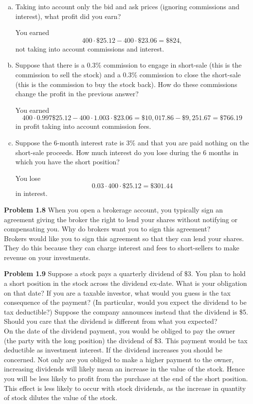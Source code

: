 \documentclass[12pt]{article}
\newcommand{\problem}[1]{\bigskip \noindent \textbf{Problem #1}}
\theoremstyle{plain}
\begin{document}
\begin{enumerate}[(a)]
\item Taking into account only the bid and ask prices (ignoring commissions and interest), what profit did you earn?

You earned
\[
400 \cdot \$25.12 - 400 \cdot \$23.06 = \$824,
\]
not taking into account commissions and interest.

\item Suppose that there is a 0.3\% commission to engage in short-sale (this is the commission to sell the stock) and a 0.3\% commission to close the short-sale (this is the commission to buy the stock back). How do these commissions change the profit in the previous answer?

You earned
\[
400 \cdot 0.997 \$25.12 - 400 \cdot 1.003 \cdot \$23.06 = \$10,017.86 - \$9,251.67 = \$766.19
\]
in profit taking into account commission fees.

\item Suppose the 6-month interest rate is 3\% and that you are paid nothing on the short-sale proceeds. How much interest do you lose during the 6 months in which you have the short position?

You lose
\[
0.03 \cdot 400 \cdot \$25.12 = \$301.44
\]
in interest.
\end{enumerate}

\problem{1.8} When you open a brokerage account, you typically sign an agreement giving the broker the right to lend your shares without notifying or compensating you. Why do brokers want you to sign this agreement?\\

Brokers would like you to sign this agreement so that they can lend your shares. They do this because they can charge interest and fees to short-sellers to make revenue on your investments. 

\problem{1.9} Suppose a stock pays a quarterly dividend of \$3. You plan to hold a short position in the stock across the dividend ex-date. What is your obligation on that date? If you are a taxable investor, what would you guess is the tax consequence of the payment? (In particular, would you expect the dividend to be tax deductible?) Suppose the company announces instead that the dividend is \$5. Should you care that the dividend is different from what you expected?\\

On the date of the dividend payment, you would be obliged to pay the owner (the party with the long position) the dividend of \$3. This payment would be tax deductible as investment interest. If the dividend increases you should be concerned. Not only are you obliged to make a higher payment to the owner, increasing dividends will likely mean an increase in the value of the stock. Hence you will be less likely to profit from the purchase at the end of the short position. This effect is less likely to occur with stock dividends, as the increase in quantity of stock dilutes the value of the stock.
\end{document}
